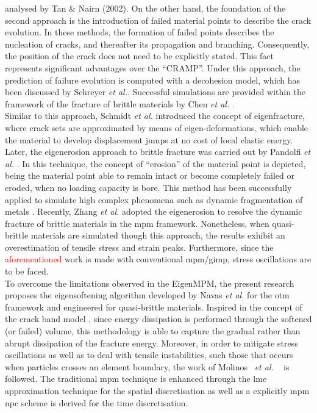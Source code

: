 \documentclass[preprint,12pt,a4paper]{elsarticle}
\newcommand{\etal}{
  \textit{et al.}
}
\begin{document}
analysed by Tan \& Nairn (2002)\cite{Nairn_2002}. On the other hand, the foundation of the second approach is the introduction of failed material points to describe the crack evolution. In these methods, the formation of failed points describes the nucleation of cracks, and
thereafter its propagation and branching. Consequently, the position
of the crack does not need to be explicitly stated. This fact represents
significant advantages over the ``CRAMP''. Under this approach, the
prediction of failure evolution is computed with a decohesion model,
which has been discussed by Schreyer {\it et al.}\cite{Schreyer_2002}. Successful simulations are provided within the framework of the fracture of brittle materials by Chen {\it et al.} \cite{Chen_2002}.\\

Similar to this approach, Schmidt {\it et al.}
\cite{Schmidt_2009} introduced the concept of eigenfracture, where
crack sets are approximated by means of eigen-deformations, which
enable the material to develop displacement jumps at no cost of local
elastic energy. Later, the eigenerosion approach to brittle fracture
was carried out by Pandolfi {\it et al.}
\cite{Pandolfi_2012,Pandolfi_2013}. In this technique, the concept of ``erosion'' of
the material point is depicted, being the material point able to remain intact or become completely failed or eroded, when no loading
capacity is bore. This method has been successfully applied to simulate high
complex phenomena such as dynamic fragmentation of metals
\cite{Li_2015}. Recently, Zhang {\it et al.}
\cite{Zhang_EE_2020} adopted the eigenerosion to resolve the dynamic
fracture of brittle materials in the \acrshort{mpm}
framework. Nonetheless, when quasi-brittle materials are simulated
though this approach, the results exhibit an overestimation of tensile
stress and strain peaks. Furthermore, since the \textcolor{red}{aforementioned} work is made with conventional \acrshort{mpm}/\acrshort{gimp}, stress oscillations are to be faced.\\

To overcome the limitations observed in the EigenMPM, the present research proposes the eigensoftening algorithm developed by Navas {\it et al.}
\cite{Navas_2017_ES,Navas2018a} for the \acrshort{otm} framework and
engineered for quasi-brittle materials. Inspired in the concept of the
crack band model \cite{Bazant83}, since energy dissipation is performed through the softened (or failed) volume, this methodology is able to capture the gradual rather than abrupt
dissipation of the fracture energy. Moreover, in order to mitigate stress
oscillations as well as to deal with tensile instabilities, such those that
occurs when particles crosses an element boundary, the work of Molinos~\etal~\cite{Molinos2020} is followed. The traditional \acrshort{mpm} technique is enhanced through the \acrfull{lme} approximation technique \cite{Arroyo2006} for the spatial discretisation as well as a explicitly \acrshort{mpm} \acrfull{npc} scheme is derived for the time discretisation.\\
\end{document}
